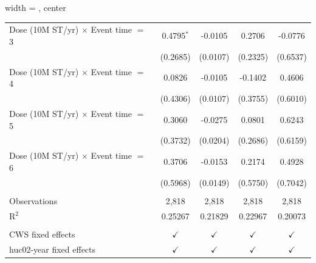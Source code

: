 \begin{table}[htbp]
\begin{adjustbox}{width = \textwidth, center}
\begin{tabular}{lcccc}
         Dose (10M ST/yr) $\times$ Event time $=$ 3   & 0.4795$^{*}$       & -0.0105            & 0.2706        & -0.0776\\   
                                                      & (0.2685)           & (0.0107)           & (0.2325)      & (0.6537)\\   
         Dose (10M ST/yr) $\times$ Event time $=$ 4   & 0.0826             & -0.0105            & -0.1402       & 0.4606\\   
                                                      & (0.4306)           & (0.0107)           & (0.3755)      & (0.6010)\\   
         Dose (10M ST/yr) $\times$ Event time $=$ 5   & 0.3060             & -0.0275            & 0.0801        & 0.6243\\   
                                                      & (0.3732)           & (0.0204)           & (0.2686)      & (0.6159)\\   
         Dose (10M ST/yr) $\times$ Event time $=$ 6   & 0.3706             & -0.0153            & 0.2174        & 0.4928\\   
                                                      & (0.5968)           & (0.0149)           & (0.5750)      & (0.7042)\\   
         
          \\
         
         Observations                                 & 2,818              & 2,818              & 2,818         & 2,818\\  
         R$^2$                                        & 0.25267            & 0.21829            & 0.22967       & 0.20073\\  
         
          \\
         
         CWS fixed effects                            & $\checkmark$       & $\checkmark$       & $\checkmark$  & $\checkmark$\\   
         huc02-year fixed effects                     & $\checkmark$       & $\checkmark$       & $\checkmark$  & $\checkmark$\\   
         
         \bottomrule
         
      \end{tabular}
      
      

\end{adjustbox}
\end{table}
